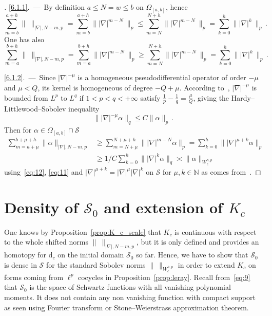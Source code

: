 \documentclass[11pt]{article}
\theoremstyle{definition}
\newenvironment{proofc}[1][\proofname]{\begin{proof}[#1]}{\end{proof}}
\newcommand{\pointir}{.\ ---\ }
\numberwithin{equation}{section}
\numberwithin{figure}{section}
\numberwithin{table}{section}
\newcommand{\N}{\mathbb{N}}
\newcommand*\calS{\mathcal{S}}
\newcommand{\dd}{\mathrm{d}}
\begin{document}
\begin{proofc}
\eqref{6.1.1}\pointir By definition $a\leq N= w \leq b$ on $\Omega_{[a,b]}$, hence
\[
\sum_{m=b}^{a+h} \|\ \|_{|\nabla|, N-m, p} = \sum_{m=b}^{a+h}
\||\nabla|^{m-N}\ \|_p \leq \sum_{m=N}^{N+h}
\||\nabla|^{m-N} \ \|_p = \sum_{k=0}^h
\||\nabla|^k \ \|_p \,.
\]
One has also
\[
\sum_{m=a}^{b+h} \|\ \|_{|\nabla|, N-m, p} = \sum_{m=a}^{b+h}
\||\nabla|^{m-N}\ \|_p \geq \sum_{m=N}^{N+h}
\||\nabla|^{m-N} \ \|_p = \sum_{k=0}^h
\||\nabla|^k \ \|_p \,.
\]



\eqref{6.1.2}\pointir Since $|\nabla|^{-\mu}$ is a homogeneous pseudodifferential operator of order $-\mu$ and $\mu<Q$, its kernel is homogeneous of degree $-Q+\mu$. According to~\cite[Proposition~1.11]{Folland_1975}, $|\nabla|^{-\mu}$ is bounded from $L^{p}$ to $L^{q}$ if $1<p<q < +\infty$ satisfy $\frac{1}{p} - \frac{1}{q} = \frac{\mu}{Q}$, giving the Hardy--Littlewood--Sobolev inequality
\begin{equation}\label{eq:12}
\||\nabla|^{-\mu}\alpha\|_q \leq C \|\alpha \|_p \,.
\end{equation}
Then for $\alpha \in \Omega_{[a,b]}\cap \mathcal{S}$
\begin{align*}
\sum_{m=a+ \mu}^{b+\mu + h} \| \alpha \|_{|\nabla|, N-m,p} & \geq \sum_{m=N+\mu}^{N+\mu+ h} \||\nabla|^{m-N} \alpha \|_p = \sum_{k=0}^h \| |\nabla|^{\mu + k} \alpha\|_p\\
& \geq 1/C \sum_{k=0}^h \||\nabla|^k \alpha\|_q \asymp
\|\alpha\|_{W^{h,p}_c}
\end{align*}
using~\eqref{eq:12}, \eqref{eq:11} and $|\nabla|^{\mu + k} = |\nabla|^\mu |\nabla|^k $ on $\mathcal{S}$ for $\mu,k\in \N$ as comes from~\cite[Theorem~3.15]{Folland_1975}.
\end{proofc}


\section{Density of \texorpdfstring{$\calS_0$}{S0} and extension of \texorpdfstring{$K_c$}{Kc}}\label{sec:density-s_0}

One knows by Proposition~\ref{prop:K_c_scale} that $K_c$ is continuous with respect to the whole shifted norms $\|\ \|_{|\nabla|, N-m,p}$, but it is only defined and provides an homotopy for $\dd_c$ on the initial domain $\calS_0$ so far. Hence, we have to show that $\calS_0$ is dense in $\calS$ for the standard Sobolev norms $\|\ \|_{W^{h,p}_c}$ in order to extend $K_c$ on forms coming from $\ell^p$ cocycles in Proposition~\ref{prop:leray}. Recall from~\eqref{eq:9} that $\calS_0$ is the space of Schwartz functions with all vanishing polynomial moments. It does not contain any non vanishing function with compact support as seen using Fourier transform or Stone--Weierstrass approximation theorem.
\end{document}
